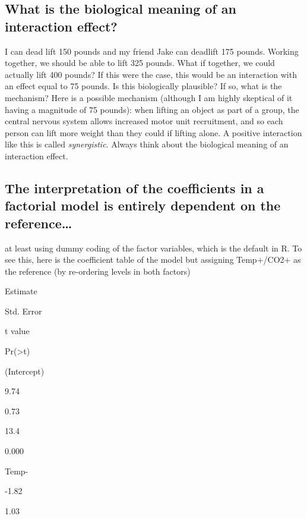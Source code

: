 \documentclass[]{book}
\begin{document}
\hypertarget{what-is-the-biological-meaning-of-an-interaction-effect}{%
\subsection{What is the biological meaning of an interaction effect?}\label{what-is-the-biological-meaning-of-an-interaction-effect}}

I can dead lift 150 pounds and my friend Jake can deadlift 175 pounds. Working together, we should be able to lift 325 pounds. What if together, we could actually lift 400 pounds? If this were the case, this would be an interaction with an effect equal to 75 pounds. Is this biologically plausible? If so, what is the mechanism? Here is a possible mechanism (although I am highly skeptical of it having a magnitude of 75 pounds): when lifting an object as part of a group, the central nervous system allows increased motor unit recruitment, and so each person can lift more weight than they could if lifting alone. A positive interaction like this is called \emph{synergistic}. Always think about the biological meaning of an interaction effect.

\hypertarget{the-interpretation-of-the-coefficients-in-a-factorial-model-is-entirely-dependent-on-the-reference}{%
\subsection{The interpretation of the coefficients in a factorial model is entirely dependent on the reference\ldots{}}\label{the-interpretation-of-the-coefficients-in-a-factorial-model-is-entirely-dependent-on-the-reference}}

at least using dummy coding of the factor variables, which is the default in R. To see this, here is the coefficient table of the model but assigning Temp+/CO2+ as the reference (by re-ordering levels in both factors)

Estimate

Std. Error

t value

Pr(\textgreater\textbar t\textbar)

(Intercept)

9.74

0.73

13.4

0.000

Temp-

-1.82

1.03
\end{document}
